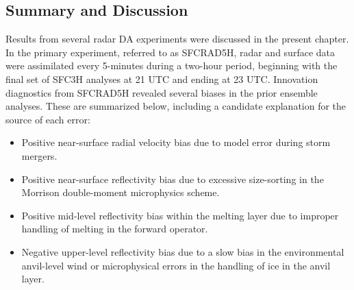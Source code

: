 \subsection{Summary and Discussion}
Results from several radar DA experiments were discussed in the present chapter. In the primary experiment, referred to as SFCRAD5H, radar and surface data were assimilated every 5-minutes during a two-hour period, beginning with the final set of SFC3H analyses at 21 UTC and ending at 23 UTC. Innovation diagnostics from SFCRAD5H revealed several biases in the prior ensemble analyses. These are summarized below, including a candidate explanation for the source of each error:

\begin{itemize}
\item Positive near-surface radial velocity bias due to model error during storm mergers.
\item Positive near-surface reflectivity bias due to excessive size-sorting in the Morrison double-moment microphysics scheme.
\item Positive mid-level reflectivity bias within the melting layer due to improper handling of melting in the forward operator.
\item Negative upper-level reflectivity bias due to a slow bias in the environmental anvil-level wind or microphysical errors in the handling of ice in the anvil layer.
\end{itemize}

